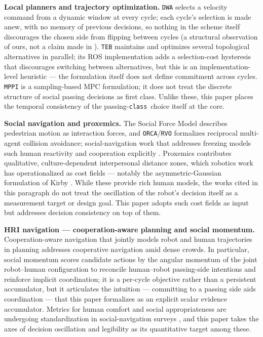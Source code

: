 \documentclass[11pt]{article}
\newcommand{\Class}{\texttt{class}}
\begin{document}
\textbf{Local planners and trajectory optimization.} \texttt{DWA} \cite{fox1997dwa} selects a velocity command from a dynamic window at every cycle; each cycle's selection is made anew, with no memory of previous decisions, so nothing in the scheme itself discourages the chosen side from flipping between cycles (a structural observation of ours, not a claim made in \cite{fox1997dwa}). \texttt{TEB} \cite{rosmann2017teb} maintains and optimizes several topological alternatives in parallel; its ROS implementation adds a selection-cost hysteresis that discourages switching between alternatives, but this is an implementation-level heuristic --- the formulation itself does not define commitment across cycles. \texttt{MPPI} \cite{williams2017mppi} is a sampling-based MPC formulation; it does not treat the discrete structure of social passing decisions as first class. Unlike these, this paper places the temporal consistency of the passing-\Class\ choice itself at the core.

\textbf{Social navigation and proxemics.} The Social Force Model \cite{helbing1995social} describes pedestrian motion as interaction forces, and \texttt{ORCA}/\texttt{RVO} \cite{vandenberg2011rvo} formalizes reciprocal multi-agent collision avoidance; social-navigation work that addresses freezing models such human reactivity and cooperation explicitly \cite{trautman2010, trautman2015dense}. Proxemics \cite{hall1966hidden} contributes qualitative, culture-dependent interpersonal distance zones, which robotics work has operationalized as cost fields --- notably the asymmetric-Gaussian formulation of Kirby \cite{kirby2010thesis}. While these provide rich human models, the works cited in this paragraph do not treat the oscillation of the robot's decision itself as a measurement target or design goal. This paper adopts such cost fields as input but addresses decision consistency on top of them.

\textbf{HRI navigation --- cooperation-aware planning and social momentum.} Cooperation-aware navigation that jointly models robot and human trajectories in planning \cite{trautman2015dense} addresses cooperative navigation amid dense crowds. In particular, social momentum \cite{mavrogiannis2022momentum} scores candidate actions by the angular momentum of the joint robot--human configuration to reconcile human--robot passing-side intentions and reinforce implicit coordination; it is a per-cycle objective rather than a persistent accumulator, but it articulates the intuition --- committing to a passing side aids coordination --- that this paper formalizes as an explicit scalar evidence accumulator. Metrics for human comfort and social appropriateness are undergoing standardization in social-navigation surveys \cite{mavrogiannis2023survey, gao2022evaluation, francis2023principles}, and this paper takes the axes of decision oscillation and legibility as its quantitative target among these.
\end{document}
